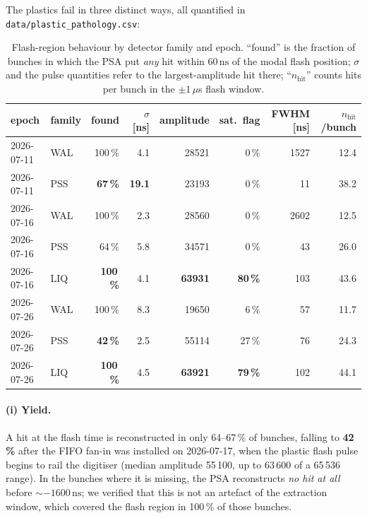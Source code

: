 \documentclass[11pt,a4paper]{article}
\newcommand{\ns}{\,\mathrm{ns}}
\begin{document}
The plastics fail in three distinct ways, all quantified in
\texttt{data/plastic\_pathology.csv}:

\begin{table}[htbp]
\centering
\small
\caption{Flash-region behaviour by detector family and epoch. ``found'' is the
fraction of bunches in which the PSA put \emph{any} hit within $60\ns$ of the
modal flash position; $\sigma$ and the pulse quantities refer to the
largest-amplitude hit there; ``$n_\mathrm{hit}$'' counts hits per bunch in the
$\pm1\,\mu$s flash window.}
\label{tab:path}
\begin{tabular}{llrrrrrr}
\toprule
epoch & family & found & $\sigma$ [ns] & amplitude & sat.\ flag & FWHM [ns] & $n_\mathrm{hit}$/bunch \\
\midrule
2026-07-11 & WAL & 100\,\% & 4.1 & 28521 & 0\,\% & 1527 & 12.4 \\
2026-07-11 & PSS & \textbf{67\,\%} & \textbf{19.1} & 23193 & 0\,\% & 11 & 38.2 \\
2026-07-16 & WAL & 100\,\% & 2.3 & 28560 & 0\,\% & 2602 & 12.5 \\
2026-07-16 & PSS & 64\,\% & 5.8 & 34571 & 0\,\% & 43 & 26.0 \\
2026-07-16 & LIQ & \textbf{100\,\%} & 4.1 & \textbf{63931} & \textbf{80\,\%} & 103 & 43.6 \\
2026-07-26 & WAL & 100\,\% & 8.3 & 19650 & 6\,\% & 57 & 11.7 \\
2026-07-26 & PSS & \textbf{42\,\%} & 2.5 & 55114 & 27\,\% & 76 & 24.3 \\
2026-07-26 & LIQ & \textbf{100\,\%} & 4.5 & \textbf{63921} & \textbf{79\,\%} & 102 & 44.1 \\
\bottomrule
\end{tabular}
\end{table}

\paragraph{(i) Yield.} A hit at the flash time is reconstructed in only
64--67\,\% of bunches, falling to \textbf{42\,\%} after the FIFO fan-in was
installed on 2026-07-17, when the plastic flash pulse begins to rail the
digitiser (median amplitude 55\,100, up to 63\,600 of a 65\,536 range). In the
bunches where it is missing, the PSA reconstructs \emph{no hit at all} before
${\sim}-1600\ns$; we verified that this is not an artefact of the extraction
window, which covered the flash region in 100\,\% of those bunches.
\end{document}
